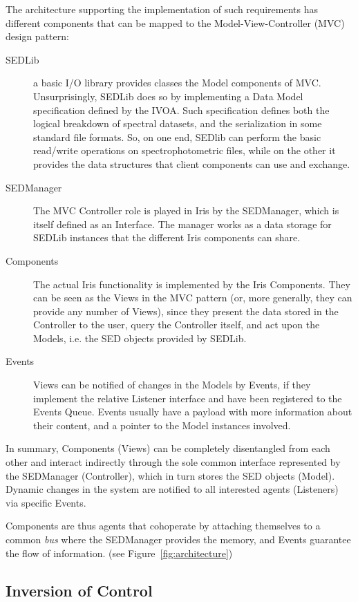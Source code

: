 \documentclass[5p]{elsarticle}
\begin{document}
The architecture supporting the implementation of such requirements has different components that can be mapped to the Model-View-Controller (MVC) design pattern:
\begin{description}
\item[SEDLib] a basic I/O library provides classes the Model components of MVC. Unsurprisingly, SEDLib does so by implementing a Data Model specification defined by the IVOA. Such specification defines both the logical breakdown of spectral datasets, and the serialization in some standard file formats. So, on one end, SEDlib can perform the basic read/write operations on spectrophotometric files, while on the other it provides the data structures that client components can use and exchange.
\item[SEDManager] The MVC Controller role is played in Iris by the SEDManager, which is itself defined as an Interface. The manager works as a data storage for SEDLib instances that the different Iris components can share.
\item[Components] The actual Iris functionality is implemented by the Iris Components. They can be seen as the Views in the MVC pattern (or, more generally, they can provide any number of Views), since they present the data stored in the Controller to the user, query the Controller itself, and act upon the Models, i.e. the SED objects provided by SEDLib.
\item[Events] Views can be notified of changes in the Models by Events, if they implement the relative Listener interface and have been registered to the Events Queue. Events usually have a payload with more information about their content, and a pointer to the Model instances involved.
\end{description}

In summary, Components (Views) can be completely disentangled from each other and interact indirectly through the sole common interface represented by the SEDManager (Controller), which in turn stores the SED objects (Model). Dynamic changes in the system are notified to all interested agents (Listeners) via specific Events.

Components are thus agents that cohoperate by attaching themselves to a common \emph{bus} where the SEDManager provides the memory, and Events guarantee the flow of information. (see Figure~\ref{fig:architecture})

\subsection{Inversion of Control}
\end{document}
